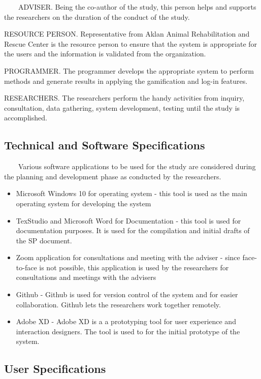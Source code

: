 ~~~~ADVISER. Being the co-author of the study, this person helps and supports the researchers on the duration of the conduct of the study.

RESOURCE PERSON. Representative from Aklan Animal Rehabilitation and Rescue Center is the resource person to ensure that the system is appropriate for the users and the information is validated from the organization.

PROGRAMMER. The programmer develops the appropriate system to perform methods and generate results in applying the gamification and log-in features.

RESEARCHERS. The researchers perform the handy activities from inquiry, consultation, data gathering, system development, testing until the study is accomplished.

\subsection{Technical and Software Specifications}

~~~~Various software applications to be used for the study are considered during the planning and development phase as conducted by the researchers.

\begin{itemize}
	\item Microsoft Windows 10 for operating system - this tool is used as the main operating system for developing the system
	\item TexStudio and Microsoft Word for Documentation - this tool is used for documentation purposes. It is used for the compilation and initial drafts of the SP  document.
	\item Zoom application for consultations and meeting with the adviser - since face-to-face is not possible, this application is used by the researchers for consultations and meetings with the advisers
	\item Github - Github is used for version control of the system and for easier  collaboration. Github lets the researchers work together remotely.
	\item Adobe XD - Adobe XD is a a prototyping tool for user experience and interaction designers. The tool is used to for the initial prototype of the system.
\end{itemize}

\subsection{User Specifications}

